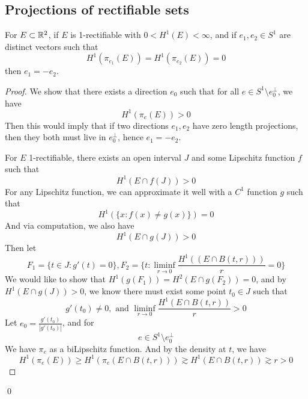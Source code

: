 \subsection{Projections of rectifiable sets}
\begin{theorem}
    For $E\subset\mathbb{R}^2$, if $E$ is 1-rectifiable with $0<H^1(E)<\infty$, and if $e_1, e_2\in S^1$ are distinct vectors such that 
    \begin{equation*}
        H^1(\pi_{e_1}(E))=H^1(\pi_{e_2}(E))=0
    \end{equation*}
    then $e_1=-e_2$.
\end{theorem}
\begin{proof}
    We show that there exists a direction $e_0$ such that for all $e\in S^1\setminus e_0^\perp$, we have
    \begin{equation*}
        H^1(\pi_e(E))>0
    \end{equation*}
    Then this would imply that if two directions $e_1, e_2$ have zero length projections, then they both must live in $e_0^\perp$, hence $e_1=-e_2$.

    For $E$ 1-rectifiable, there exists an open interval $J$ and some Lipschitz function $f$ such that 
    \begin{equation*}
        H^1(E\cap f(J))>0
    \end{equation*}
    For any Lipschitz function, we can approximate it well with a $C^1$ function $g$ such that 
    \begin{equation*}
        H^1(\{x: f(x)\neq g(x)\})=0
    \end{equation*}
    And via computation, we also have
    \begin{equation*}
        H^1(E\cap g(J))>0
    \end{equation*}
    Then let
    \begin{equation*}
        F_1=\{t\in J: g'(t)=0\}, F_2=\{t: \liminf_{r\to 0}\frac{H^1((E\cap B(t,r)))}{r}=0\}
    \end{equation*}
    We would like to show that $H^1(g(F_1))=H^2(E\cap g(F_2))=0$, and by $H^1(E\cap g(J))>0$, we know there must exist some point $t_0\in J$ such that 
    \begin{equation*}
        g'(t_0)\neq 0, \text{ and }\liminf_{r\to 0}\frac{H^1(E\cap B(t,r))}{r}>0
    \end{equation*}
    Let $e_0=\frac{g'(t_0)}{|g'(t_0)|}$, and for 
    \begin{equation*}
        e\in S^1\setminus e_0^\perp
    \end{equation*}
    We have $\pi_e$ as a biLipschitz function. And by the density at $t$, we have
    \begin{equation*}
        H^1(\pi_e(E))\geq H^1(\pi_e(E\cap B(t,r)))\gtrsim H^1(E\cap B(t,r))\gtrsim r>0
    \end{equation*}
\end{proof}
\qed




